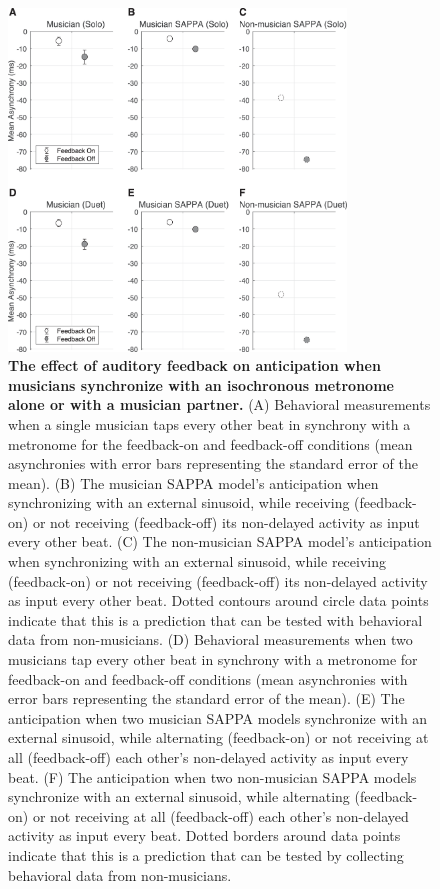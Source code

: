\documentclass{report}
\begin{document}
\begin{figure}
    \centering
    \includegraphics[width=0.8\textwidth]{figures/fig2_3.png}
    \caption[The effect of auditory feedback on anticipation when musicians synchronize with an isochronous metronome alone or with a musician partner]{\textbf{The effect of auditory feedback on anticipation when musicians synchronize with an isochronous metronome alone or with a musician partner.} (A) Behavioral measurements when a single musician taps every other beat in synchrony with a metronome for the feedback-on and feedback-off conditions (mean asynchronies with error bars representing the standard error of the mean). (B) The musician SAPPA model’s anticipation when synchronizing with an external sinusoid, while receiving (feedback-on) or not receiving (feedback-off) its non-delayed activity as input every other beat. (C) The non-musician SAPPA model’s anticipation when synchronizing with an external sinusoid, while receiving (feedback-on) or not receiving (feedback-off) its non-delayed activity as input every other beat. Dotted contours around circle data points indicate that this is a prediction that can be tested with behavioral data from non-musicians. (D) Behavioral measurements when two musicians tap every other beat in synchrony with a metronome for feedback-on and feedback-off conditions (mean asynchronies with error bars representing the standard error of the mean). (E) The anticipation when two musician SAPPA models synchronize with an external sinusoid, while alternating (feedback-on) or not receiving at all (feedback-off) each other’s non-delayed activity as input every beat. (F) The anticipation when two non-musician SAPPA models synchronize with an external sinusoid, while alternating (feedback-on) or not receiving at all (feedback-off) each other’s non-delayed activity as input every beat. Dotted borders around data points indicate that this is a prediction that can be tested by collecting behavioral data from non-musicians.}
    \label{f2_3}
\end{figure}
\end{document}
